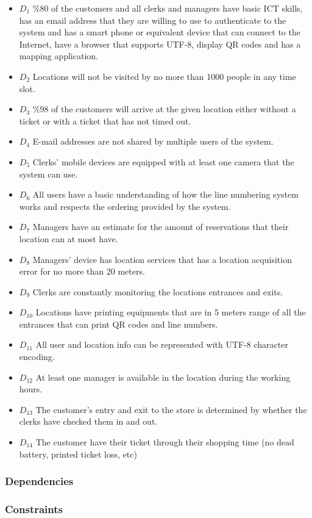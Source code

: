 \begin{itemize}
    \item \textbf{$D_1$} \%80 of the customers and all clerks and managers have basic ICT skills, has an email address that they are willing to use to authenticate to the system and has a smart phone or equivalent device that can connect to the Internet, have a browser that supports UTF-8, display QR codes and has a mapping application. %
    \item \textbf{$D_2$} Locations will not be visited by no more than 1000 people in any time slot. %
    \item \textbf{$D_3$} \%98 of the customers will arrive at the given location either without a ticket or with a ticket that has not timed out. %
    \item \textbf{$D_4$} E-mail addresses are not shared by multiple users of the system. %
    \item \textbf{$D_5$} Clerks' mobile devices are equipped with at least one camera that the system can use. %
    \item \textbf{$D_6$} All users have a basic understanding of how the line numbering system works and respects the ordering provided by the system. %
    \item \textbf{$D_7$} Managers have an estimate for the amount of reservations that their location can at most have. %
    \item \textbf{$D_8$} Managers' device has location services that has a location acquisition error for no more than 20 meters. %
    \item \textbf{$D_9$} Clerks are constantly monitoring the locations entrances and exits. %
    \item \textbf{$D_{10}$} Locations have printing equipments that are in 5 meters range of all the entrances that can print QR codes and line numbers. %
    \item \textbf{$D_{11}$} All user and location info can be represented with UTF-8 character encoding. %
    \item \textbf{$D_{12}$} At least one manager is available in the location during the working hours. %
    \item \textbf{$D_{13}$} The customer's entry and exit to the store is determined by whether the clerks have checked them in and out.
    \item \textbf{$D_{14}$} The customer have their ticket through their shopping time (no dead battery, printed ticket loss, etc) %
\end{itemize}
\subsubsection{Dependencies}
\subsubsection{Constraints}
